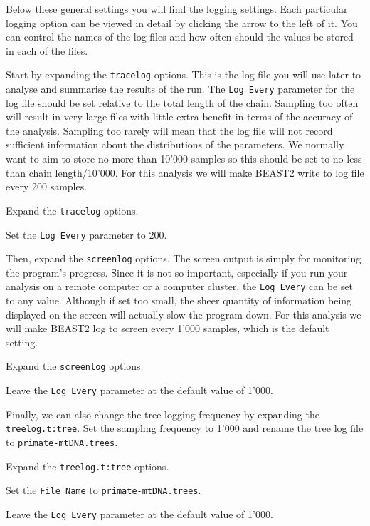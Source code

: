 \documentclass[11pt]{article}
\begin{document}
Below these general settings you will find the logging settings. Each particular logging option can be viewed in detail by clicking the arrow to the left of it. You can control the names of the log files and how often should the values be stored in each of the files.

Start by expanding the \texttt{tracelog} options. This is the log file you will use later to analyse and summarise the results of the run. The \texttt{Log Every} parameter for the log file should be set relative to the total length of the chain. Sampling too often will result in very large files with little extra benefit in terms of the accuracy of the analysis. Sampling too rarely will mean that the log file will not record sufficient information about the distributions of the parameters. We normally want to aim to store no more than 10'000 samples so this should be set to no less than chain length/10'000. For this analysis we will make BEAST2 write to log file every 200 samples.

\begin{framed}
Expand the \texttt{tracelog} options.

Set the \texttt{Log Every} parameter to 200.
\end{framed}

Then, expand the \texttt{screenlog} options. The screen output is simply for monitoring the program's progress. Since it is not so important, especially if you run your analysis on a remote computer or a computer cluster, the \texttt{Log Every} can be set to any value. Although if set too small, the sheer quantity of information being displayed on the screen will actually slow the program down. For this analysis we will make BEAST2 log to screen every 1'000 samples, which is the default setting.

\begin{framed}
Expand the \texttt{screenlog} options.

Leave the \texttt{Log Every} parameter at the default value of 1'000.
\end{framed}

Finally, we can also change the tree logging frequency by expanding the \texttt{treelog.t:tree}. Set the sampling frequency to 1'000 and rename the tree log file to \texttt{primate-mtDNA.trees}.

\begin{framed}
Expand the \texttt{treelog.t:tree} options.

Set the \texttt{File Name} to \texttt{primate-mtDNA.trees}.

Leave the \texttt{Log Every} parameter at the default value of 1'000.
\end{framed}
\end{document}
